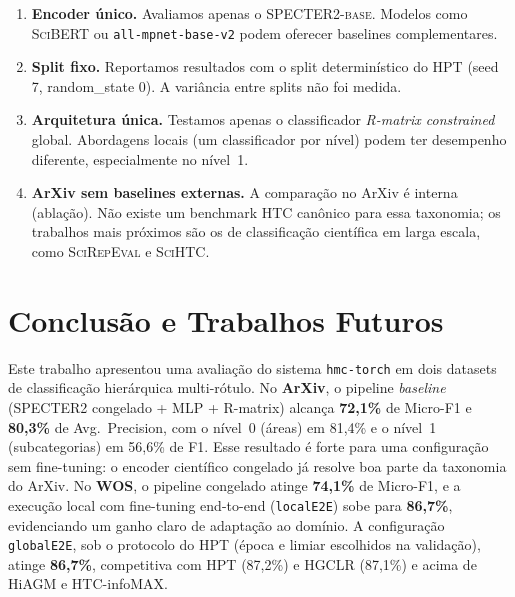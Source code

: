 \documentclass[11pt,a4paper,twoside]{article}
\begin{document}
\begin{enumerate}[leftmargin=*, itemsep=2pt]
  \item \textbf{Encoder único.} Avaliamos apenas o \textsc{SPECTER2-base}.
        Modelos como \textsc{SciBERT} \cite{beltagy2019scibert} ou
        \texttt{all-mpnet-base-v2} podem oferecer baselines complementares.
  \item \textbf{Split fixo.} Reportamos resultados com o split determinístico
        do HPT (seed 7, random\_state 0). A variância entre splits não foi medida.
  \item \textbf{Arquitetura única.} Testamos apenas o classificador
        \textit{R-matrix constrained} global. Abordagens locais (um classificador
        por nível) podem ter desempenho diferente, especialmente no nível~1.
  \item \textbf{ArXiv sem baselines externas.} A comparação no ArXiv é interna
        (ablação). Não existe um benchmark HTC canônico para essa taxonomia;
        os trabalhos mais próximos são os de classificação científica em larga
        escala, como \textsc{SciRepEval} e \textsc{SciHTC}.
\end{enumerate}

\section{Conclusão e Trabalhos Futuros}
\label{sec:conclusion}

Este trabalho apresentou uma avaliação do sistema \texttt{hmc-torch} em dois
datasets de classificação hierárquica multi-rótulo. No \textbf{ArXiv}, o pipeline
\textit{baseline} (SPECTER2 congelado + MLP + R-matrix) alcança
\textbf{72,1\%} de Micro-F1 e \textbf{80,3\%} de Avg.\ Precision, com o
nível~0 (áreas) em 81,4\% e o nível~1 (subcategorias) em 56,6\% de F1.
Esse resultado é forte para uma configuração sem fine-tuning: o encoder
científico congelado já resolve boa parte da taxonomia do ArXiv. No
\textbf{WOS}, o pipeline congelado atinge \textbf{74,1\%} de Micro-F1, e a
execução local com fine-tuning end-to-end (\texttt{localE2E}) sobe para
\textbf{86,7\%}, evidenciando um ganho claro de adaptação ao domínio.
A configuração \texttt{globalE2E}, sob o protocolo do HPT (época e limiar
escolhidos na validação), atinge \textbf{86,7\%}, competitiva com HPT (87,2\%)
e HGCLR (87,1\%) e acima de HiAGM e HTC-infoMAX.
\end{document}
